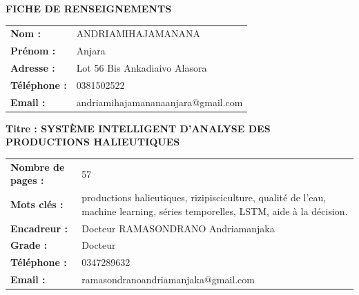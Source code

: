 \documentclass[a4paper,12pt, oneside]{article}
\begin{document}
\vspace*{\fill}
\newpage
\vspace*{\fill}
\begin{center}

	{\bfseries\large FICHE DE RENSEIGNEMENTS}
\end{center}

\vspace*{1cm}
\begin{flushleft}
    \begin{tabular}{@{}ll}
        \textbf{Nom :} & ANDRIAMIHAJAMANANA\\[0.3cm]
        \textbf{Prénom :} & Anjara \\[0.3cm]
        \textbf{Adresse :} & Lot 56 Bis Ankadiaivo Alasora \\[0.3cm]
        \textbf{Téléphone :} & 0381502522 \\[0.3cm]
        \textbf{Email :} & andriamihajamananaanjara@gmail.com
    \end{tabular}
    
    \vspace*{1.5cm}
    
    \noindent \textbf{Titre : SYSTÈME INTELLIGENT D'ANALYSE DES PRODUCTIONS HALIEUTIQUES}
    
    \vspace*{1.5cm}
    
    \begin{longtable}{p{4.5cm}p{13cm}}
        \textbf{Nombre de pages :} & 57 \\[0.3cm]
        \textbf{Mots clés :} & productions halieutiques, rizipisciculture, qualité de l'eau, machine learning, séries temporelles, LSTM, aide à la décision.\\[0.3cm]
        \textbf{Encadreur :} & Docteur RAMASONDRANO Andriamanjaka\\[0.3cm]
        \textbf{Grade :} & Docteur \\[0.3cm]
        \textbf{Téléphone :} & 0347289632 \\[0.3cm]
        \textbf{Email :} & ramasondranoandriamanjaka@gmail.com
    \end{longtable}
\end{flushleft}
\vspace*{\fill}
\end{document}
